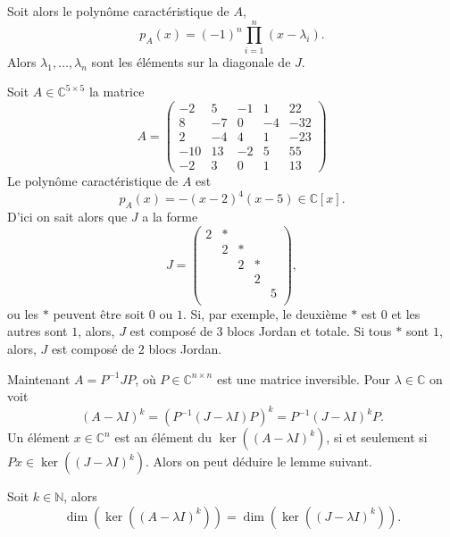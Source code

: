 \noindent 
Soit  alors le polynôme caractéristique de $A$, 
\begin{equation}
  \label{eq:57}
  p_A(x) = (-1)^n ∏_{i=1}^n (x - λ_{i}). 
\end{equation}
Alors $λ_1,\dots,λ_n$ sont les éléments sur la diagonale de $J$. 

\begin{example}
  \label{exe:52}

  Soit $A ∈ ℂ^{5 ×5}$ la matrice
  \begin{displaymath}
    A =  \left(\begin{array}{rrrrr}
-2 & 5 & -1 & 1 & 22 \\
8 & -7 & 0 & -4 & -32 \\
2 & -4 & 4 & 1 & -23 \\
-10 & 13 & -2 & 5 & 55 \\
-2 & 3 & 0 & 1 & 13
\end{array}\right)
\end{displaymath}
%
Le polynôme caractéristique de $A$ est
\begin{displaymath}
  p_A(x) = - (x-2)^4 (x-5) ∈ℂ[x]. 
\end{displaymath}
%
D'ici on sait alors que $J$ a la forme
\begin{displaymath}
  J =
  \begin{pmatrix}
    2 & *  \\
    & 2 & * \\
    & & 2 & * \\
    & & & 2   \\
    & & & & 5 \\
  \end{pmatrix}, 
\end{displaymath}
ou les $*$ peuvent être soit $0$ ou $1$. Si, par exemple, le deuxième $*$ est $0$ et les autres sont $1$, alors, $J$ est composé de $3$ blocs Jordan et totale. Si tous $*$ sont $1$, alors, $J$ est composé de $2$ blocs Jordan. 
\end{example}

Maintenant $A = P^{-1} J P$, où $P ∈ℂ^{n×n}$ est une matrice inversible.  Pour $λ ∈ ℂ$ on voit
\begin{displaymath}
  (A - λI)^k =  \left (P^{-1} (J - λ I) P \right)^k = P^{-1} (J - λ I)^k  P. 
\end{displaymath}
Un élément $x ∈ℂ^n$ est an élément du $\ker \left((A - λI)^k\right)$, si et seulement si $P x ∈ \ker \left((J - λI)^k\right)$. Alors on peut déduire le lemme suivant.
\begin{lemma}
  \label{lem:28}
  Soit $k ∈ ℕ$, alors
  \begin{displaymath}
     \dim(\ker \left((A - λI)^k \right)) = \dim(\ker \left((J- λI)^k \right)). 
  \end{displaymath}
\end{lemma}

